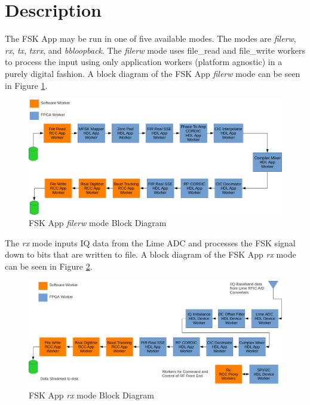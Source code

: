 \section{Description}
The FSK App may be run in one of five available modes. The modes are \textit{filerw}, \textit{rx}, \textit{tx}, \textit{txrx}, and \textit{bbloopback}. The \textit{filerw} mode uses file\_read and file\_write workers to process the input using only application workers (platform agnostic) in a purely digital fashion. A block diagram of the FSK App \textit{filerw} mode can be seen in Figure \ref{fig:filerw_mode_block_diagram}.
	\begin{figure}[H]
	 	\centering
		\includegraphics[scale=.55]{filerw_mode_block_diagram}
		\caption{FSK App \textit{filerw} mode Block Diagram}
		\label{fig:filerw_mode_block_diagram}
	\end{figure}

\newpage
\noindent The \textit{rx} mode inputs IQ data from the Lime ADC and processes the FSK signal down to bits that are written to file. A block diagram of the FSK App \textit{rx} mode can be seen in Figure \ref{fig:rx_mode_block_diagram}.\par\medskip
	\begin{figure}[H]
	 	\centering
		\includegraphics[scale=.55]{rx_mode_block_diagram}
		\caption{FSK App \textit{rx} mode Block Diagram}
		\label{fig:rx_mode_block_diagram}
	\end{figure}

